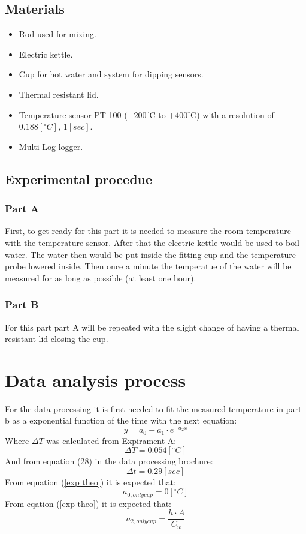 \documentclass[12pt,a4paper]{report}
\begin{document}
\subsection{Materials}
\begin{itemize}[leftmargin=2em]
    \item Rod used for mixing.
    \item Electric kettle.
    \item Cup for hot water and system for dipping sensors.
    \item Thermal resistant lid.
    \item Temperature sensor PT-100 ($-200^\circ$C to $+400^\circ$C) with a resolution of $0.188[^\circ C]$, $1[sec]$.
    \item Multi-Log logger.
\end{itemize} 
\subsection{Experimental procedue}
\subsubsection{Part A}
First, to get ready for this part it is needed to measure the room temperature with the temperature sensor.
\newline
After that the electric kettle would be used to boil water. 
The water then would be put inside the fitting cup and the temperature probe lowered inside.
Then once a minute the temperatue of the water will be measured for as long as possible (at least one hour).
\subsubsection{Part B}
For this part part A will be repeated with the slight change of having a thermal resistant lid closing the cup.

\section{Data analysis process }
For the data processing it is first needed to fit the measured temperature in part b as a exponential function of the time with the next equation:
\begin{equation}
    y = a_0 + a_1\cdot e^{-a_2 x}
\end{equation}
Where $\Delta T$ was calculated from Expirament A:
$$\Delta T = 0.054 [^\circ C]$$
And from equation (28) in the data processing brochure:
$$\Delta t = 0.29 [sec]$$
From equation (\eqref{exp theo}) it is expected that:
$$a_{0,only cup} = 0[^\circ C]$$
From eqation (\eqref{exp theo}) it is expected that:
$$a_{2,only cup} = \frac{h\cdot A}{C_w}$$
\end{document}
